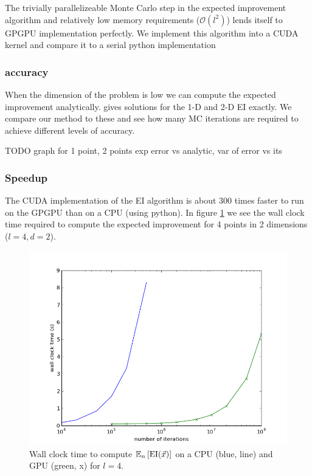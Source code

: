 \documentclass[phd,tocprelim]{cornell}
\begin{document}
The trivially parallelizeable Monte Carlo step in the expected improvement algorithm and relatively low memory requirements ($\mathcal{O}(l^{2})$) lends itself to GPGPU implementation perfectly. We implement this algorithm into a CUDA kernel and compare it to a serial python implementation

\subsubsection{accuracy}

When the dimension of the problem is low we can compute the expected improvement analytically. \cite{Ginsbourger2008} gives solutions for the 1-D and 2-D EI exactly. We compare our method to these and see how many MC iterations are required to achieve different levels of accuracy.

TODO
graph for 1 point, 2 points exp error vs analytic, var of error vs its

\subsubsection{Speedup}

The CUDA implementation of the EI algorithm is about 300 times faster to run on the GPGPU than on a CPU (using python). In figure \ref{GPUspeed1} we see the wall clock time required to compute the expected improvement for 4 points in 2 dimensions ($l=4, d=2$).

 \begin{figure}[hpt]
 	\centerline{\includegraphics[width=\textwidth]{figures/EPI/exp_EI_speedup_vs_its.png}}
    \caption[CPU vs GPU time to compute EI]{Wall clock time to compute $\mathbb{E}_{n}\left[{\rm EI}(\vec{x})\right]$ on a CPU (blue, line) and GPU (green, x) for $l = 4$.}
 	\label{GPUspeed1}
 \end{figure}
\end{document}
